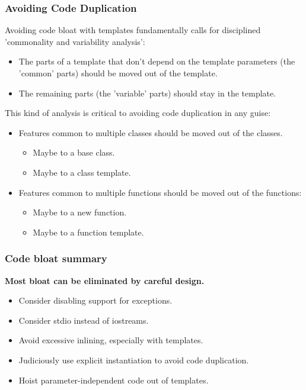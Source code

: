 \subsubsection{Avoiding Code Duplication}
Avoiding code bloat with templates fundamentally calls for disciplined 'commonality and variability analysis':
\begin{itemize}
  \item The parts of a template that don't depend on the template parameters (the 'common' parts) should be moved out of the template.
  \item The remaining parts (the 'variable' parts) should stay in the template.
\end{itemize}
This kind of analysis is critical to avoiding code duplication in any guise:
\begin{itemize}
  \item Features common to multiple classes should be moved out of the classes.
  \begin{itemize}
    \item Maybe to a base class.
    \item Maybe to a class template.
  \end{itemize}
  \item Features common to multiple functions should be moved out of the functions:
  \begin{itemize}
    \item Maybe to a new function.
    \item Maybe to a function template.
  \end{itemize}
\end{itemize}

\subsubsection{Code bloat summary}
\textbf{Most bloat can be eliminated by careful design.}
\begin{itemize}
  \item Consider disabling support for exceptions.
  \item Consider stdio instead of iostreams.
  \item Avoid excessive inlining, especially with templates.
  \item Judiciously use explicit instantiation to avoid code duplication.
  \item Hoist parameter-independent code out of templates.
\end{itemize}

